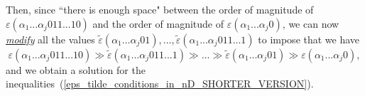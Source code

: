 \documentclass[12pt,letterpaper]{article}
\newtheorem{rem}[thm]{Remark}
\renewcommand{\S}{\mathcal{S}}
\newcommand{\B}{\mathcal{B}}
\newcommand{\eps}{\varepsilon}
\newcommand{\et}{\tilde\eps}
\newcommand{\nbhd}{\mathit{nbhd}}
\renewcommand{\a}{\alpha}
\begin{document}
%
Then,  since ``there is enough space" between the order of magnitude of  $\eps(\a_1...\a_j 011...10)$   and the order of magnitude of $\eps(\a_1...\a_j 0)$, we can now \ul{\em modify} all the values  $\et(\a_1...\a_j 01),  ..., \et(\a_1...\a_j 011...1)$ to impose that  we have 
$$
\eps(\a_1...\a_j 011...10) \gg \et(\a_1...\a_j 011...1) \gg ... \gg \et(\a_1...\a_j 01) \gg \eps(\a_1...\a_j 0),
$$
and we obtain a solution for  the inequalities~(\ref{eps_tilde_conditions_in_nD_SHORTER_VERSION}). 








%
%







%
\end{document}
